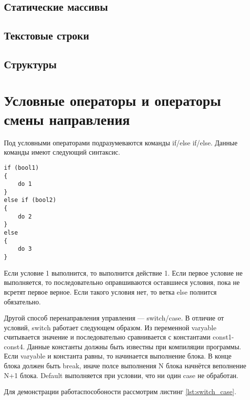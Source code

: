\documentclass{bmstu}
\begin{document}

\subsection{Статические массивы}

\begin{comment}
\begin{lstlisting}[caption={}, label={lst:},]
\end{lstlisting}
\end{comment}

\subsection{Текстовые строки}
\subsection{Структуры}
\section{Условные операторы и операторы смены направления}

Под условными операторами подразумеваются команды if/else if/else. 
Данные команды имеют следующий синтаксис.


\begin{lstlisting}[caption={Условный оператор}, label={lst:if},]
if (bool1) 
{
    do 1
}  
else if (bool2) 
{
    do 2
} 
else 
{
    do 3
}
\end{lstlisting}

Если условие 1 выполнится, то выполнится действие 1.
Если первое условие не выполняется, то последовательно оправшиваются оставшиеся условия, пока не всретят первое верное.
Если такого условия нет, то ветка else полнится обязательно.

Другой способ перенаправления управления --- switch/case.
В отличие от условий, switch работает следующем образом. 
Из переменной varyable считывается значение и последовательно сравнивается с константами const1-const4.
Данные константы должны быть известны при компиляции программы.
Если varyable и константа равны, то начинается выполнение блока.
В конце блока должен быть break, иначе полсе выполнения N блока начнётся веполнение N+1 блока.
Default выполняется при условии, что ни один case не обработан.

Для демонстрации работаспособоности рассмотрим листинг \ref{lst:switch_case}.
\end{document}
